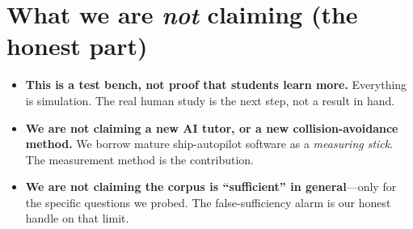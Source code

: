 \documentclass[11pt]{article}
\begin{document}
\section*{What we are \emph{not} claiming (the honest part)}

\begin{itemize}[leftmargin=1.4em]
  \item \textbf{This is a test bench, not proof that students learn more.} Everything is
  simulation. The real human study is the next step, not a result in hand.
  \item \textbf{We are not claiming a new AI tutor, or a new collision-avoidance method.} We
  borrow mature ship-autopilot software as a \emph{measuring stick}. The measurement method is the
  contribution.
  \item \textbf{We are not claiming the corpus is ``sufficient'' in general}---only for the
  specific questions we probed. The false-sufficiency alarm is our honest handle on that limit.
\end{itemize}
\end{document}
